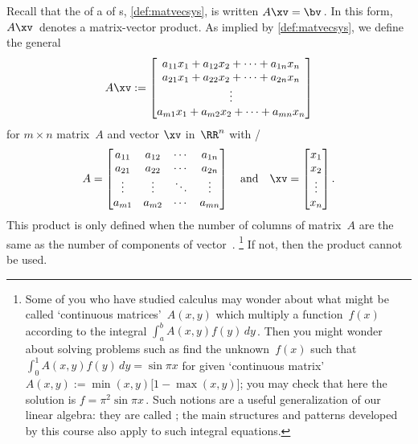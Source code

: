 Recall that the  of a  of s, \autoref{def:matvecsys}, is written \(A\xv=\bv\)\,.  
In this form, \(A\xv\)~denotes a matrix-vector product.
As implied by \autoref{def:matvecsys}, we define the general  
\begin{equation*}
A\xv:=
\begin{bmatrix} a_{11}x_1+a_{12}x_2+\cdots+a_{1n}x_n
\\a_{21}x_1+a_{22}x_2+\cdots+a_{2n}x_n
\\\vdots
\\a_{m1}x_1+a_{m2}x_2+\cdots+a_{mn}x_n
\end{bmatrix}
\end{equation*}
for \(m\times n\) matrix~\(A\) and vector \(\xv\) in~\(\RR^n\) with \slash {}
\begin{equation*}
A=\begin{bmatrix} a_{11}&a_{12}&\cdots&a_{1n}
\\a_{21}&a_{22}&\cdots&a_{2n}
\\\vdots&\vdots&\ddots&\vdots
\\a_{m1}&a_{m2}&\cdots&a_{mn} \end{bmatrix}
\quad\text{and}\quad
\xv=\begin{bmatrix} x_1\\x_2\\\vdots\\x_n \end{bmatrix}.
\end{equation*}
This product is only defined when the number of columns of matrix~\(A\) are the same as the number of components of vector~\xv.%
\footnote{Some of you who have studied calculus may wonder about what might be called `continuous matrices'~\(A(x,y)\) which multiply a function~\(f(x)\) according to the integral \(\int_a^b A(x,y)f(y)\,dy\)\,.  
Then you might wonder about solving problems such as find the unknown~\(f(x)\) such that \(\int_0^1 A(x,y)f(y)\,dy=\sin\pi x\) for given `continuous matrix' \(A(x,y):=\min(x,y)\big[1-\max(x,y)\big]\); 
you may check that here the solution is \(f=\pi^2\sin\pi x\)\,.
Such notions are a useful generalization of our linear algebra: they are called ; the main structures and patterns developed by this course also apply to such integral equations.}
If not, then the product cannot be used.

